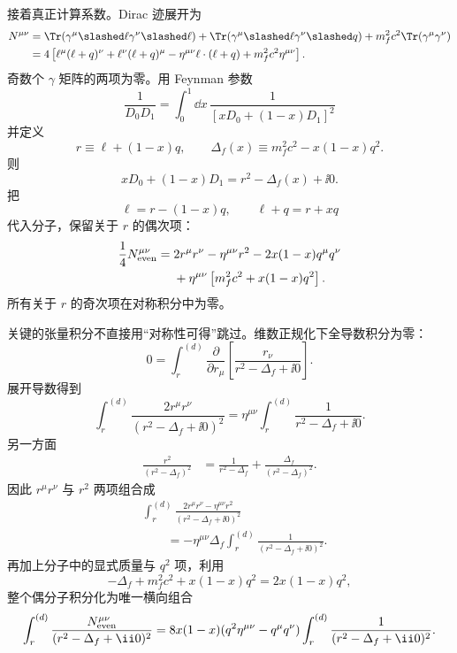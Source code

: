 \begin{derivation}[夸克圈对规范耦合的修正]
接着真正计算系数。Dirac 迹展开为
\begin{align*}
 N^{\mu\nu}
 &=\Tr(\gamma^\mu\slashed\ell\gamma^\nu\slashed\ell)
 +\Tr(\gamma^\mu\slashed\ell\gamma^\nu\slashed q)
 +m_f^2c^2\Tr(\gamma^\mu\gamma^\nu)\\
 &=4\left[
 \ell^\mu(\ell+q)^\nu
 +\ell^\nu(\ell+q)^\mu
 -\eta^{\mu\nu}\ell\cdot(\ell+q)
 +m_f^2c^2\eta^{\mu\nu}
 \right].
\end{align*}
奇数个 $\gamma$ 矩阵的两项为零。用 Feynman 参数
\begin{equation*}
 \frac1{D_0D_1}
 =\int_0^1\dd x\,
 \frac1{[xD_0+(1-x)D_1]^2}
\end{equation*}
并定义
\begin{equation*}
 r\equiv\ell+(1-x)q,
 \qquad
 \Delta_f(x)\equiv m_f^2c^2-x(1-x)q^2.
\end{equation*}
则
\begin{equation*}
 xD_0+(1-x)D_1=r^2-\Delta_f(x)+\ii0.
\end{equation*}
把
\begin{equation*}
 \ell=r-(1-x)q,
 \qquad
 \ell+q=r+xq
\end{equation*}
代入分子，保留关于 $r$ 的偶次项：
\begin{align*}
 \frac14N^{\mu\nu}_{\rm even}
 ={}&2r^\mu r^\nu-\eta^{\mu\nu}r^2
 -2x(1-x)q^\mu q^\nu\\
 &+\eta^{\mu\nu}
 \left[m_f^2c^2+x(1-x)q^2\right].
\end{align*}
所有关于 $r$ 的奇次项在对称积分中为零。

关键的张量积分不直接用“对称性可得”跳过。维数正规化下全导数积分为零：
\begin{equation*}
 0=\int_r^{(d)}
 \frac{\partial}{\partial r_\mu}
 \left[
 \frac{r_\nu}{r^2-\Delta_f+\ii0}
 \right].
\end{equation*}
展开导数得到
\begin{equation*}
 \int_r^{(d)}
 \frac{2r^\mu r^\nu}
 {(r^2-\Delta_f+\ii0)^2}
 =\eta^{\mu\nu}
 \int_r^{(d)}
 \frac1{r^2-\Delta_f+\ii0}.
\end{equation*}
另一方面
\begin{align*}
 \frac{r^2}{(r^2-\Delta_f)^2}
 &=\frac1{r^2-\Delta_f}
 +\frac{\Delta_f}{(r^2-\Delta_f)^2}.
\end{align*}
因此 $r^\mu r^\nu$ 与 $r^2$ 两项组合成
\begin{align*}
 &\int_r^{(d)}
 \frac{2r^\mu r^\nu-\eta^{\mu\nu}r^2}
 {(r^2-\Delta_f+\ii0)^2}\\
 &\qquad=-\eta^{\mu\nu}\Delta_f
 \int_r^{(d)}
 \frac1{(r^2-\Delta_f+\ii0)^2}.
\end{align*}
再加上分子中的显式质量与 $q^2$ 项，利用
\begin{equation*}
 -\Delta_f+m_f^2c^2+x(1-x)q^2
 =2x(1-x)q^2,
\end{equation*}
整个偶分子积分化为唯一横向组合
\begin{align*}
 \int_r^{(d)}\frac{N^{\mu\nu}_{\rm even}}
 {(r^2-\Delta_f+\ii0)^2}
 =8x(1-x)
 (q^2\eta^{\mu\nu}-q^\mu q^\nu)
 \int_r^{(d)}\frac1{(r^2-\Delta_f+\ii0)^2}.
\end{align*}


\end{derivation}
